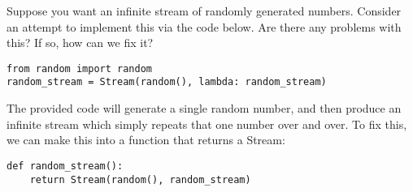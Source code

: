 \question Suppose you want an infinite stream of randomly generated numbers.
Consider an attempt to implement this via the code below.
Are there any problems with this? If so, how can we fix it?

\begin{lstlisting}
from random import random
random_stream = Stream(random(), lambda: random_stream)
\end{lstlisting}

\begin{solution}[2cm]
The provided code will generate a single random number, and then produce an
infinite stream which simply repeats that one number over and over. To fix this,
we can make this into a function that returns a Stream:
\begin{lstlisting}
def random_stream():
    return Stream(random(), random_stream)
\end{lstlisting}
\end{solution}
